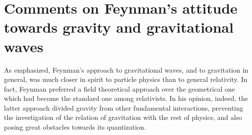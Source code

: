 \documentclass{ws-procs961x669}            %
\begin{document}
\section{Comments on Feynman's attitude towards gravity and gravitational waves}\label{Comments}

As emphasized, Feynman's approach to gravitational waves, and to
gravitation in general, was much closer in spirit to particle
physics than to general relativity. In fact, Feynman preferred a
field theoretical approach over the geometrical one which had
become the standard one among relativists. In his opinion, indeed,
the latter approach divided gravity from other fundamental
interactions, preventing the investigation of the relation of
gravitation with the rest of physics, and also posing great
obstacles towards its quantization.
\end{document}
